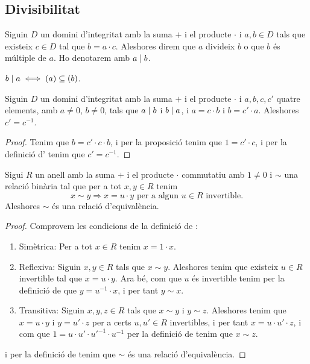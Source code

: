 \documentclass[../Apunts.tex]{subfiles}
\begin{document}
	\subsection{Divisibilitat}
	\begin{definition}
		\label{def:divisor per anells}
		\label{def:múltiple per anells}
		Siguin \(D\) un domini d'integritat amb la suma \(+\) i el producte \(\cdot\) i \(a,b\in D\) tals que existeix \(c\in D\) tal que \(b=a\cdot c\). Aleshores direm que \(a\) divideix \(b\) o que \(b\) és múltiple de \(a\). Ho denotarem amb \(a\mathrel{|} b\).
	\end{definition}
	\begin{observation}
		\label{obs:divisors són ideals continguts}
		\(b\mathrel{|} a\iff(a)\subseteq(b)\).
	\end{observation}
	\begin{proposition}
		\label{prop:podem passar els múltiples de costat a costat}
		Siguin \(D\) un domini d'integritat amb la suma \(+\) i el producte \(\cdot\) i \(a,b,c,c'\) quatre elements, amb \(a\neq0\), \(b\neq0\), tals que \(a\mathrel{|} b\) i \(b\mathrel{|} a\), i \(a=c\cdot b\) i \(b=c'\cdot a\). Aleshores \(c'=c^{-1}\).
		\begin{proof}
			Tenim que \(b=c'\cdot c\cdot b\), i per la proposició  tenim que \(1=c'\cdot c\), i per la definició d' tenim que \(c'=c^{-1}\).
		\end{proof}
	\end{proposition}
	\begin{proposition}
		\label{prop:associats és relació d'equivalència}
		Sigui \(R\) un anell amb la suma \(+\) i el producte \(\cdot\) commutatiu amb \(1\neq0\) i \(\sim\) una relació binària tal que per a tot \(x,y\in R\) tenim
		\[x\sim y\Longrightarrow x=u\cdot y\text{ per a algun }u\in R\text{ invertible}.\]
		Aleshores \(\sim\) és una relació d'equivalència.
		\begin{proof}
			Comprovem les condicions de la definició de \myref{def:relació d'equivalència}:
			\begin{enumerate}
				\item Simètrica: Per a tot \(x\in R\) tenim \(x=1\cdot x\).
				\item Reflexiva: Siguin \(x,y\in R\) tals que \(x\sim y\). Aleshores tenim que existeix \(u\in R\) invertible tal que \(x=u\cdot y\). Ara bé, com que \(u\) és invertible tenim per la definició de  que \(y=u^{-1}\cdot x\), i per tant \(y\sim x\).
				\item Transitiva: Siguin \(x,y,z\in R\) tals que \(x\sim y\) i \(y\sim z\). Aleshores tenim que \(x=u\cdot y\) i \(y=u'\cdot z\) per a certs \(u,u'\in R\) invertibles, i per tant \(x=u\cdot u'\cdot z\), i com que \(1=u\cdot u'\cdot {u'}^{-1}\cdot{u}^{-1}\) per la definició de  tenim que \(x\sim z\).
			\end{enumerate}
			i per la definició de  tenim que \(\sim\) és una relació d'equivalència.
		\end{proof}
	\end{proposition}
\end{document}
